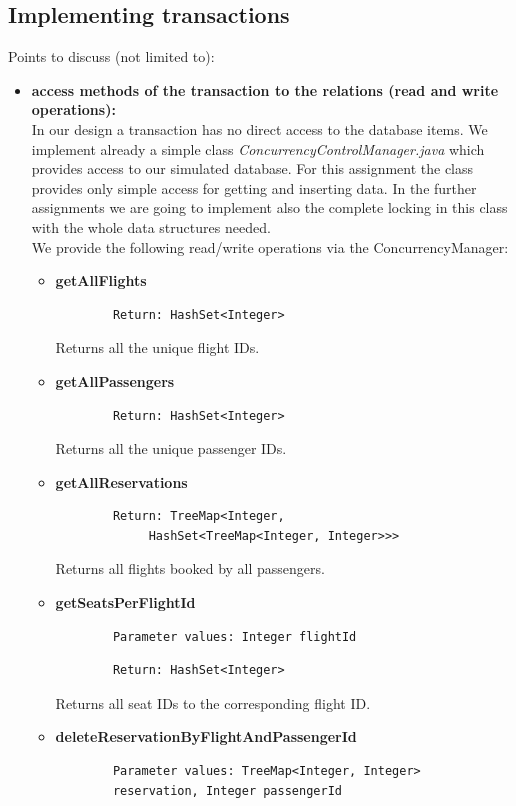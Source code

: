 \documentclass{vldb}
\begin{document}
\subsection{Implementing transactions}

Points to discuss (not limited to):
\begin{itemize}
\item \textbf{access methods of the transaction to the relations (read and write operations):}
\\In our design a transaction has no direct access to the database items. We implement already a simple class \textit{ConcurrencyControlManager.java} which provides access to our simulated database. For this assignment the class provides only simple access for getting and inserting data. In the further assignments we are going to implement also the complete locking in this class with the whole data structures needed. 
\\We provide the following read/write operations via the ConcurrencyManager:
\begin{itemize}
\item \textbf{getAllFlights}
	\begin{verbatim}
		Return: HashSet<Integer>
	\end{verbatim}
Returns all the unique flight IDs.
\item \textbf{getAllPassengers}
	\begin{verbatim}
		Return: HashSet<Integer>
	\end{verbatim}
Returns all the unique passenger IDs.
\item \textbf{getAllReservations}
	\begin{verbatim}
		Return: TreeMap<Integer, 
		     HashSet<TreeMap<Integer, Integer>>>
	\end{verbatim}
Returns all flights booked by all passengers.
\item \textbf{getSeatsPerFlightId}
	\begin{verbatim}
		Parameter values: Integer flightId
	\end{verbatim}
	\begin{verbatim}
		Return: HashSet<Integer>
	\end{verbatim}
Returns all seat IDs to the corresponding flight ID.
\item \textbf{deleteReservationByFlightAndPassengerId}
	\begin{verbatim}
		Parameter values: TreeMap<Integer, Integer> 
		reservation, Integer passengerId
	\end{verbatim}

\end{itemize}
\end{itemize}
\end{document}
